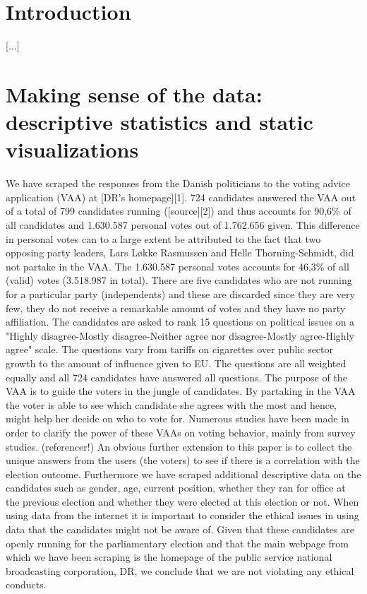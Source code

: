 \section{Introduction}
[...]

\section{Making sense of the data: descriptive statistics and static visualizations}

We have scraped the responses from the Danish politicians to the voting advice application (VAA) at [DR's homepage][1]. 724 candidates answered the VAA out of a total of 799 candidates running ([source][2]) and thus accounts for 90,6\% of all candidates and 1.630.587 personal votes out of 1.762.656 given. This difference in personal votes can to a large extent be attributed to the fact that two opposing party leaders, Lars Løkke Rasmussen and Helle Thorning-Schmidt, did not partake in the VAA. The 1.630.587 personal votes accounts for 46,3\% of all (valid) votes (3.518.987 in total). 
There are five candidates who are not running for a particular party (independents) and these are discarded since they are very few, they do not receive a remarkable amount of votes and they have no party affiliation. 
The candidates are asked to rank 15 questions on political issues on a "Highly disagree-Mostly disagree-Neither agree nor disagree-Mostly agree-Highly agree" scale. The questions vary from tariffs on cigarettes over public sector growth to the amount of influence given to EU. The questions are all weighted equally and all 724 candidates have answered all questions. The purpose of the VAA is to guide the voters in the jungle of candidates. By partaking in the VAA the voter is able to see which candidate she agrees with the most and hence, might help her decide on who to vote for. Numerous studies have been made in order to clarify the power of these VAAs on voting behavior, mainly from survey studies. (referencer!) An obvious further extension to this paper is to collect the unique answers from the users (the voters) to see if there is a correlation with the election outcome.  
Furthermore we have scraped additional descriptive data on the candidates such as gender, age, current position, whether they ran for office at the previous election and whether they were elected at this election or not. When using data from the internet it is important to consider the ethical issues in using data that the candidates might not be aware of. Given that these candidates are openly running for the parliamentary election and that the main webpage from which we have been scraping is the homepage of the public service national broadcasting corporation, DR, we conclude that we are not violating any ethical conducts. 

